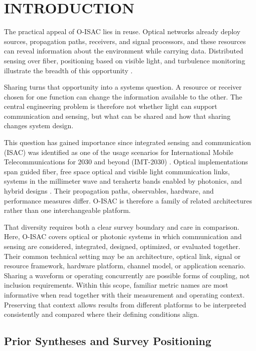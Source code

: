 \section{INTRODUCTION}
\label{sec:introduction}
The practical appeal of O-ISAC lies in reuse. Optical networks already deploy
sources, propagation paths, receivers, and signal processors, and these
resources can reveal information about the environment while carrying data.
Distributed sensing over fiber, positioning based on visible light, and
turbulence monitoring illustrate the breadth of this opportunity
\cite{OISAC_SCR00013,OISAC_SCR00196,OISAC_SCR01085}.

Sharing turns that opportunity into a systems question. A resource or receiver
chosen for one function can change the information available to the other.
The central engineering problem is therefore not whether light can support
communication and sensing, but what can be shared and how that sharing changes
system design.

This question has gained importance since integrated sensing and communication
(ISAC) was identified as one of the usage scenarios for International Mobile
Telecommunications for 2030 and beyond (IMT-2030)
\cite{ITUR_M2160_2023}. Optical implementations span guided fiber, free space
optical and visible light communication links, systems in the millimeter wave
and terahertz bands enabled by photonics, and hybrid designs
\cite{OISAC_SCR00916,OISAC_SCR00036,OISAC_SCR00083}. Their propagation paths,
observables, hardware, and performance measures differ. O-ISAC is therefore a
family of related architectures rather than one interchangeable platform.

That diversity requires both a clear survey boundary and care in comparison.
Here, O-ISAC covers optical or photonic systems in which communication and
sensing are considered, integrated, designed, optimized, or evaluated together.
Their common technical setting may be an architecture, optical link, signal or
resource framework, hardware platform, channel model, or application scenario.
Sharing a waveform or operating concurrently are possible forms of coupling,
not inclusion requirements. Within this scope, familiar metric names are most
informative when read together with their measurement and operating context.
Preserving that context allows results from different platforms to be
interpreted consistently and compared where their defining conditions align.

\subsection{Prior Syntheses and Survey Positioning}
\label{sec:related_surveys}

